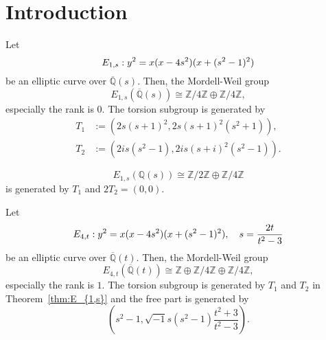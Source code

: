 \documentclass[main]{subfiles}
\begin{document}
\chapter{Introduction}

\begin{thm}
    \label{thm:E_{1,s}}
    Let
    \begin{equation}
        \label{eq:E_{1s}}
        E_{1,s}: y^{2} = x(x - 4s^{2})(x + (s^{2} - 1)^{2})
    \end{equation}
    be an elliptic curve over $\overline{\mathbb{Q}}(s)$.
    Then, the Mordell-Weil group
    \begin{equation}
        E_{1,s}(\overline{\mathbb{Q}}(s)) \cong \mathbb{Z} / 4 \mathbb{Z} \oplus \mathbb{Z} / 4 \mathbb{Z},
    \end{equation}
    especially the rank is $0$. The torsion subgroup is generated by
    \begin{align}
        T_1 & := (2s(s+1)^2, 2s(s+1)^2(s^2+1)),   \\
        T_2 & := (2is(s^2-1),2is(s+i)^2(s^2-1)).
    \end{align}
\end{thm}

\begin{cor}
    \begin{equation}
        E_{1,s}(\mathbb{Q}(s)) \cong \mathbb{Z} / 2 \mathbb{Z} \oplus \mathbb{Z} / 4 \mathbb{Z}
    \end{equation}
    is generated by $T_1$ and $2T_2=(0,0)$.
\end{cor}

\begin{thm}
    \label{thm:E_{4,t}}
    Let 
    \begin{equation}
        \label{eq:E_{4t}}
        E_{4,t}: y^{2} = x(x - 4s^{2})(x + (s^{2} - 1)^{2}),\quad s = \frac{2t}{t^{2} - 3}
    \end{equation}
    be an elliptic curve over $\overline{\mathbb{Q}}(t)$.
    Then, the Mordell-Weil group
    \begin{equation}
        E_{4,t}(\overline{\mathbb{Q}}(t)) \cong \mathbb{Z} \oplus \mathbb{Z} / 4 \mathbb{Z} \oplus \mathbb{Z} / 4 \mathbb{Z},
    \end{equation}
    especially the rank is $1$.
    The torsion subgroup is generated by $T_1$ and $T_2$ in Theorem~\ref{thm:E_{1,s}} and the free part is generated by
    \begin{equation}
        \left(s^{2} - 1, \sqrt{-1} s(s^{2} - 1) \frac{t^{2} + 3}{t^{2} - 3} \right).
    \end{equation}
\end{thm}
\end{document}
